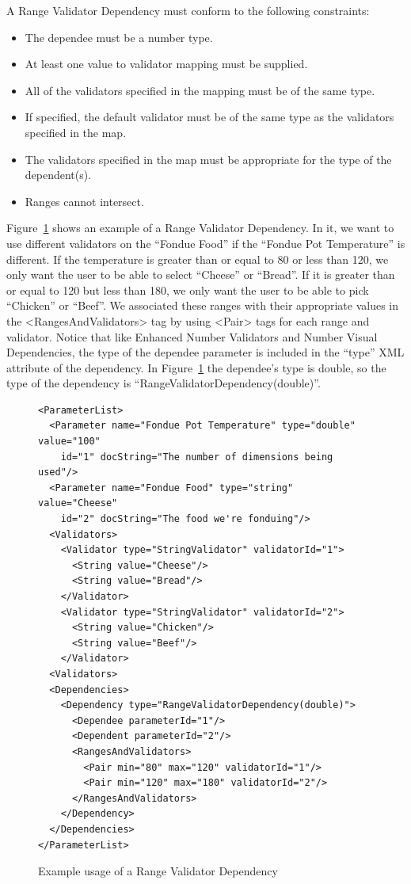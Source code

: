 A Range Validator Dependency must conform to the following constraints:
\begin{itemize}
\item The dependee must be a number type.
\item At least one value to validator mapping must be supplied.
\item All of the validators specified in the mapping must be of the same type.
\item If specified, the default validator must be of the same type as the validators specified in the map.
\item The validators specified in the map must be appropriate for the type of the dependent(s).
\item Ranges cannot intersect.
\end{itemize}

Figure~\ref{RangeValiDepXML} shows an example of a Range Validator Dependency. In it, we want to use different validators
on the ``Fondue Food'' if the ``Fondue Pot Temperature'' is different. If the temperature is greater than or equal to 80 or less than 120,
we only want the user to be able to select ``Cheese'' or ``Bread''. If it is greater than or equal to 120 but less than 180, we only want the
user to be able to pick ``Chicken'' or ``Beef''. We associated these ranges with their appropriate values in the <RangesAndValidators> tag by
using <Pair> tags for each range and validator. Notice that like Enhanced Number Validators and Number Visual Dependencies, the type of the dependee 
parameter is included in the ``type'' XML attribute of the dependency. In Figure~\ref{RangeValiDepXML} the dependee's type is double, so the type of the 
dependency is ``RangeValidatorDependency(double)''.
\begin{figure}
\centering
{\footnotesize
\begin{Verbatim}
<ParameterList>
  <Parameter name="Fondue Pot Temperature" type="double" value="100"
    id="1" docString="The number of dimensions being used"/>
  <Parameter name="Fondue Food" type="string" value="Cheese"
    id="2" docString="The food we're fonduing"/>
  <Validators>
    <Validator type="StringValidator" validatorId="1">
      <String value="Cheese"/>
      <String value="Bread"/>
    </Validator>
    <Validator type="StringValidator" validatorId="2">
      <String value="Chicken"/>
      <String value="Beef"/>
    </Validator>
  <Validators>
  <Dependencies>
    <Dependency type="RangeValidatorDependency(double)">
      <Dependee parameterId="1"/>
      <Dependent parameterId="2"/>
      <RangesAndValidators>
        <Pair min="80" max="120" validatorId="1"/>
        <Pair min="120" max="180" validatorId="2"/>
      </RangesAndValidators>
    </Dependency>
  </Dependencies>
</ParameterList>
\end{Verbatim}
}
\caption{Example usage of a Range Validator Dependency}
\label{RangeValiDepXML}
\end{figure}

